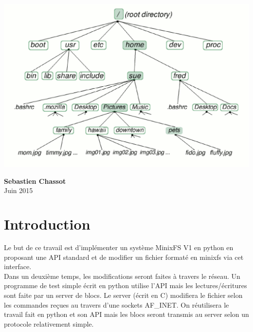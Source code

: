 \documentclass[a4paper,12pt]{article}
\begin{document}
\vspace{3cm}
\centerline{\includegraphics[scale=0.52]{imgs/illustration_FS}}
\vspace{2cm}

\begin{center}
\textbf{Sebastien Chassot} \\ Juin 2015
\end{center}

\thispagestyle{empty} %

\newpage %
\tableofcontents %
\listoffigures
\listoftables
\newpage %



\section{Introduction}

\vspace{1cm}
Le but de ce travail est d'implémenter un système MinixFS V1 en python en proposant une API standard et de modifier un fichier formaté en minixfs via cet interface.\\

Dans un deuxième temps, les modifications seront faites à travers le réseau. Un programme de test simple écrit en python utilise l'API mais les lectures/écritures sont faite par un server de blocs. Le server (écrit en C) modifiera le fichier selon les commandes reçues au travers d'une sockets AF\_INET. On réutilisera le travail fait en python et son API mais les blocs seront transmis au server selon un protocole relativement simple.
\end{document}

